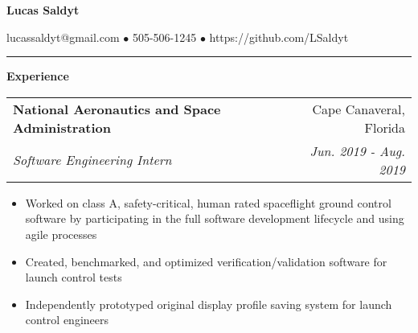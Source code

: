 \documentclass[letterpaper,11pt]{article}
\makeatletter
\newcommand{\resitem}[1]{\item #1 \vspace{-3pt}}
\newcommand{\colfill}{@{\extracolsep{\fill}}}
\newcommand{\ressubheading}[4]{
\begin{tabular*}{6.5in}{l\colfill r}
		\textbf{#1} & #2 \\
		\textit{#3} & \textit{#4} \\
\end{tabular*}\vspace{-6pt}}
\newcommand{\ressection}[2]
{
\begin{minipage}[t]{0.1\textwidth}
    \textbf{#1}
\end{minipage}
\hspace{0.04\textwidth}
\begin{minipage}[t]{0.8\textwidth}
    #2
\end{minipage}
}
\makeatother
\begin{document}
\begin{center}
    \textbf{\Large Lucas Saldyt}
\end{center}
\vspace{-1.5\baselineskip}
\begin{center}
    lucassaldyt@gmail.com $\bullet$ 505-506-1245 $\bullet$ https://github.com/LSaldyt
\end{center}
\vspace{-1.5\baselineskip}
\rule{1.0\textwidth}{1.5pt}
\vspace{-.5\baselineskip}
\newline
\ressection{Experience}
{\ressubheading{National Aeronautics and Space Administration}{Cape Canaveral, Florida}{Software Engineering Intern}{Jun. 2019 - Aug. 2019}
\begin{itemize}
	\resitem{Worked on class A, safety-critical, human rated spaceflight ground control software by participating in the full software development lifecycle and using agile processes}
     \resitem{Created, benchmarked, and optimized verification/validation software for launch control tests}
	\resitem{Independently prototyped original display profile saving system for launch control engineers}
\end{itemize}}
\end{document}
